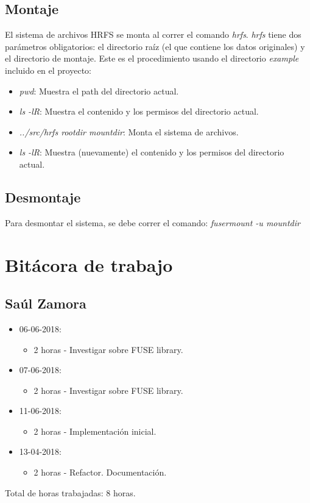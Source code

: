 \documentclass{article}
\begin{document}
\subsection{Montaje}
El sistema de archivos HRFS se monta al correr el comando \emph{hrfs}. \emph{hrfs} tiene dos par\'ametros obligatorios: el directorio ra\'iz (el que contiene los datos originales) y el directorio de montaje. Este es el procedimiento usando el directorio \emph{example} incluido en el proyecto:

\begin{itemize}
  \item \emph{pwd}: Muestra el path del directorio actual.
  \item \emph{ls -lR}: Muestra el contenido y los permisos del directorio actual.
  \item \emph{../src/hrfs rootdir mountdir}: Monta el sistema de archivos.
  \item \emph{ls -lR}: Muestra (nuevamente) el contenido y los permisos del directorio actual.
\end{itemize}

\subsection{Desmontaje}
Para desmontar el sistema, se debe correr el comando: \emph{fusermount -u mountdir}
\section{Bit\'acora de trabajo}
\subsection{Sa\'ul Zamora}
\begin{itemize}
  \item 06-06-2018:
  \begin{itemize}
    \item 2 horas - Investigar sobre FUSE library.
  \end{itemize}
  \item 07-06-2018:
  \begin{itemize}
    \item 2 horas - Investigar sobre FUSE library.
  \end{itemize}
  \item 11-06-2018:
  \begin{itemize}
    \item 2 horas - Implementaci\'on inicial.
  \end{itemize}
  \item 13-04-2018:
  \begin{itemize}
    \item 2 horas - Refactor. Documentaci\'on.
  \end{itemize}
\end{itemize}
Total de horas trabajadas: 8 horas.
\end{document}
